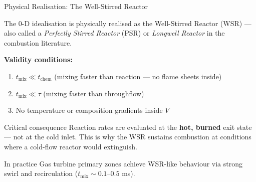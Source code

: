 \documentclass[12pt,aspectratio=169]{beamer}
\newcommand{\taures}{\tau}
\newcommand{\tchem}{t_{\text{chem}}}
\newcommand{\Vr}{V}
\begin{document}
\begin{frame}{Physical Realisation: The Well-Stirred Reactor}

  The 0-D idealisation is physically realised as the
  \alert{Well-Stirred Reactor (WSR)} --- also called a
  \textit{Perfectly Stirred Reactor} (PSR) or
  \textit{Longwell Reactor} in the combustion literature.

  \medskip
  \textbf{Validity conditions:}
  \begin{enumerate}
    \item $t_{\text{mix}} \ll \tchem$ \quad
          (mixing faster than reaction --- no flame sheets inside)
    \item $t_{\text{mix}} \ll \taures$ \quad
          (mixing faster than throughflow)
    \item No temperature or composition gradients inside $\Vr$
  \end{enumerate}

  \medskip
  \begin{alertblock}{Critical consequence}
    Reaction rates are evaluated at the \textbf{hot, burned} exit state ---
    not at the cold inlet.
    This is why the WSR sustains combustion at conditions where a cold-flow
    reactor would extinguish.
  \end{alertblock}

  \begin{exampleblock}{In practice}
    Gas turbine primary zones achieve WSR-like behaviour via strong swirl
    and recirculation ($t_{\text{mix}} \sim 0.1$--$0.5$ ms).
  \end{exampleblock}
\end{frame}
\end{document}
